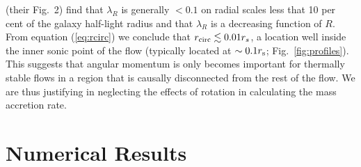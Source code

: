 \documentclass[usenatbib,fleqn]{mn2e}
\begin{document}
\citet{EmsellemCappellari+:2007a} (their Fig.~2) find that $\lambda_R$ is generally $< 0.1$ on radial scales less that 10 per cent of the galaxy half-light radius and that $\lambda_R$ is a decreasing function of $R$.  From equation (\ref{eq:rcirc}) we conclude that $r_{\rm circ} \lesssim 0.01r_{s}$, a location well inside the inner sonic point of the flow (typically located at $\sim 0.1r_{\rm s}$; Fig.~\ref{fig:profiles}).  This suggests that angular momentum is only becomes important for thermally stable flows in a region that is causally disconnected from the rest of the flow.  We are thus justifying in neglecting the effects of rotation in calculating the mass accretion rate.


\section{Numerical Results}
\label{sec:numerical}
\end{document}
